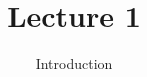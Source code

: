 \documentclass[aspectratio=43]{beamer}
\title{Lecture 1}
\subtitle{Introduction}
\date{}
\begin{document}
\begin{frame}
    \titlepage
\end{frame}
   






\end{document}
